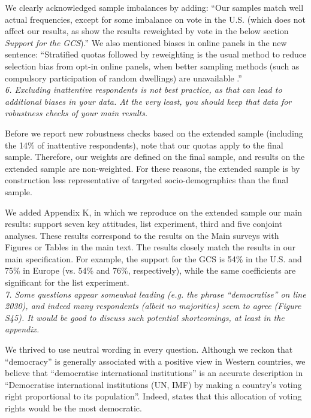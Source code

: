 \documentclass[12pt,english]{article}
\begin{document}
We clearly acknowledged sample imbalances by adding: ``Our samples match well actual frequencies, except for some imbalance on vote in the U.S. (which does not affect our results, as show the results reweighted by vote in the below section \textit{Support for the GCS}).'' We also mentioned biases in online panels in the new sentence: ``Stratified quotas followed by reweighting is the usual method to reduce selection bias from opt-in online panels, when better sampling methods (such as compulsory participation of random dwellings) are unavailable \citep{scherpenzeel_how_2010}.''
~\\

\textit{6. Excluding inattentive respondents is not best practice, as that can lead to additional biases in your data. At the very least, you should keep that data for robustness checks of your main results.}

Before we report new robustness checks based on the extended sample (including the 14\% of inattentive respondents), note that our quotas apply to the final sample. Therefore, our weights are defined on the final sample, and results on the extended sample are non-weighted. For these reasons, the extended sample is by construction less representative of targeted socio-demographics than the final sample.

We added Appendix K, in which we reproduce on the extended sample our main results: support seven key attitudes, list experiment, third and five conjoint analyses. These results correspond to the results on the Main surveys with Figures or Tables in the main text. The results closely match the results in our main specification. For example, the support for the GCS is 54\% in the U.S. and 75\% in Europe (vs. 54\% and 76\%, respectively), while the same coefficients are significant for the list experiment.
~\\

\textit{7. Some questions appear somewhat leading (e.g. the phrase “democratise” on line 2030), and indeed many respondents (albeit no majorities) seem to agree (Figure S45). It would be good to discuss such potential shortcomings, at least in the appendix.}

We thrived to use neutral wording in every question. Although we reckon that ``democracy'' is generally associated with a positive view in Western countries, we believe that ``democratise international institutions'' is an accurate description in ``Democratise international institutions (UN, IMF) by making a country's voting right proportional to its population''. Indeed, \citet{woodward_imf_2007} states that this allocation of voting rights would be the most democratic.
\end{document}
